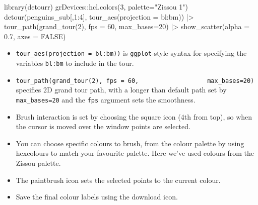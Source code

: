 \documentclass[
  letterpaper,
]{book}
\newenvironment{Shaded}{\begin{snugshade}}{\end{snugshade}}
\newcommand{\AttributeTok}[1]{\textcolor[rgb]{0.40,0.45,0.13}{#1}}
\newcommand{\ConstantTok}[1]{\textcolor[rgb]{0.56,0.35,0.01}{#1}}
\newcommand{\DecValTok}[1]{\textcolor[rgb]{0.68,0.00,0.00}{#1}}
\newcommand{\FloatTok}[1]{\textcolor[rgb]{0.68,0.00,0.00}{#1}}
\newcommand{\FunctionTok}[1]{\textcolor[rgb]{0.28,0.35,0.67}{#1}}
\newcommand{\NormalTok}[1]{\textcolor[rgb]{0.00,0.23,0.31}{#1}}
\newcommand{\SpecialCharTok}[1]{\textcolor[rgb]{0.37,0.37,0.37}{#1}}
\newcommand{\StringTok}[1]{\textcolor[rgb]{0.13,0.47,0.30}{#1}}
\providecommand{\tightlist}{%
  \setlength{\itemsep}{0pt}\setlength{\parskip}{0pt}}\usepackage{longtable,booktabs,array}
\begin{document}
\begin{Shaded}
\begin{Highlighting}[]
\FunctionTok{library}\NormalTok{(detourr)}
\NormalTok{grDevices}\SpecialCharTok{::}\FunctionTok{hcl.colors}\NormalTok{(}\DecValTok{3}\NormalTok{, }\AttributeTok{palette=}\StringTok{"Zissou 1"}\NormalTok{)}
\FunctionTok{detour}\NormalTok{(penguins\_sub[,}\DecValTok{1}\SpecialCharTok{:}\DecValTok{4}\NormalTok{], }
       \FunctionTok{tour\_aes}\NormalTok{(}\AttributeTok{projection =}\NormalTok{ bl}\SpecialCharTok{:}\NormalTok{bm)) }\SpecialCharTok{|\textgreater{}}
       \FunctionTok{tour\_path}\NormalTok{(}\FunctionTok{grand\_tour}\NormalTok{(}\DecValTok{2}\NormalTok{), }\AttributeTok{fps =} \DecValTok{60}\NormalTok{, }
                 \AttributeTok{max\_bases=}\DecValTok{20}\NormalTok{) }\SpecialCharTok{|\textgreater{}}
       \FunctionTok{show\_scatter}\NormalTok{(}\AttributeTok{alpha =} \FloatTok{0.7}\NormalTok{, }
                    \AttributeTok{axes =} \ConstantTok{FALSE}\NormalTok{)}
\end{Highlighting}
\end{Shaded}

\begin{itemize}
\tightlist
\item
  \texttt{tour\_aes(projection\ =\ bl:bm))} is \texttt{ggplot}-style
  syntax for specifying the variables \texttt{bl:bm} to include in the
  tour.
\item
  \texttt{tour\_path(grand\_tour(2),\ fps\ =\ 60,\ \ \ \ \ \ \ \ \ \ \ \ \ \ \ \ \ \ \ max\_bases=20)}
  specifies 2D grand tour path, with a longer than default path set by
  \texttt{max\_bases=20} and the \texttt{fps} argument sets the
  smoothness.
\item
  Brush interaction is set by choosing the square icon (4th from top),
  so when the cursor is moved over the window points are selected.
\item
  You can choose specific colours to brush, from the colour palette by
  using hexcolours to match your favourite palette. Here we've used
  colours from the Zissou palette.
\item
  The paintbrush icon sets the selected points to the current colour.
\item
  Save the final colour labels using the download icon.
\end{itemize}
\end{document}
